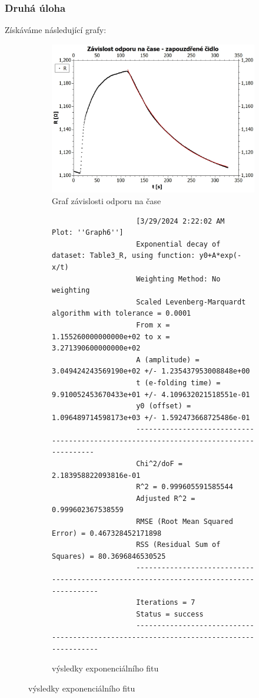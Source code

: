 \documentclass[czech,11pt,a4paper]{article}
\begin{document}
	\subsubsection{Druhá úloha}
	Získáváme následující grafy:
	\begin{figure}[H]
		
		\begin{subfigure}{0.6\textwidth}
			\includegraphics[width=1\linewidth, ]{zapouzdrene} 
			\caption{Graf závislosti odporu na čase}
			\label{fig:subim1}
		\end{subfigure}
		\begin{subfigure}{0.4\textwidth}
			{\tiny \begin{verbatim}
					[3/29/2024 2:22:02 AM	Plot: ''Graph6'']
					Exponential decay of dataset: Table3_R, using function: y0+A*exp(-x/t)
					Weighting Method: No weighting
					Scaled Levenberg-Marquardt algorithm with tolerance = 0.0001
					From x = 1.155260000000000e+02 to x = 3.271390600000000e+02
					A (amplitude) = 3.049424243569190e+02 +/- 1.235437953008848e+00
					t (e-folding time) = 9.910052453670433e+01 +/- 4.109632021518551e-01
					y0 (offset) = 1.096489714598173e+03 +/- 1.592473668725486e-01
					--------------------------------------------------------------------------------------
					Chi^2/doF = 2.183958822093816e-01
					R^2 = 0.999605591585544
					Adjusted R^2 = 0.999602367538559
					RMSE (Root Mean Squared Error) = 0.467328452171898
					RSS (Residual Sum of Squares) = 80.3696846530525
					---------------------------------------------------------------------------------------
					Iterations = 7
					Status = success
					---------------------------------------------------------------------------------------
			\end{verbatim}}
			\caption{výsledky exponenciálního fitu}
		\end{subfigure}
	\end{figure}
\end{document}
